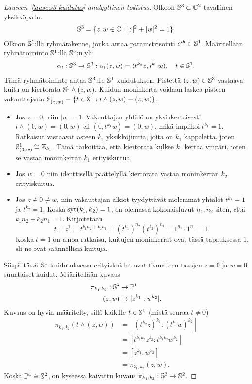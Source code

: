 \begin{proof}[Lauseen~\ref{lause:s3-kuidutus} analyyttinen todistus]
    Olkoon $\S^3\subset\C^2$ tavallinen yksikköpallo:
    \begin{equation*}
        \S^3=\{z,w\in\C:|z|^2+|w|^2=1\}.
    \end{equation*}
    Olkoon $\S^1$:llä ryhmärakenne, jonka antaa parametrisointi $e^{i\theta}\in\S^1$. Määritellään ryhmätoiminto $\S^1$:llä $\S^3$:n yli:
    \begin{equation*}
        \alpha_t:\S^3\to\S^3:\alpha_t(z,w)=(t^{k_2} z,t^{k_1} w),\quad t\in\S^1.
    \end{equation*}
    Tämä ryhmätoiminto antaa $\S^3$:lle $\S^1$-kuidutuksen. Pistettä $(z,w)\in\S^3$ vastaava kuitu on kiertorata $\S^1\wedge(z,w)$. Kuidun moninkerta voidaan laskea pisteen vakauttajasta $\S^1_{(z,w)}=\{t\in\S^1:t\wedge (z,w)=(z,w)\}$.
    \begin{itemize}
        \item Jos $z=0$, niin $|w|=1$. Vakauttajan yhtälö on yksinkertaisesti $t\wedge(0,w)=(0,w)$ eli $(0,t^{k_1} w)=(0,w)$, mikä implikoi $t^{k_1}=1$. Ratkaisut vastaavat asteen $k_1$ yksikköjuuria, joita on $k_1$ kappaletta, joten $\S^1_{(0,w)}\cong\Z_{k_1}$. Tämä tarkoittaa, että kiertorata kulkee $k_1$ kertaa ympäri, joten se vastaa moninkerran $k_1$ erityiskuitua.
        \item Jos $w=0$ niin identtisellä päättelyllä kiertorata vastaa moninkerran $k_2$ erityiskuitua.
        \item Jos $z\ne0\ne w$, niin vakauttajan alkiot tyydyttävät molemmat yhtälöt $t^{k_1}=1$ ja $t^{k_2}=1$. Koska $\syt(k_1,k_2)=1$, on olemassa kokonaisluvut $n_1,n_2$ siten, että $k_1n_2+k_2n_1=1$. Kirjoitetaan
        \begin{equation*}
            t=t^1=t^{k_1n_2+k_2n_1}=(t^{k_1})^{n_2}(t^{k_2})^{n_1}=1^{n_2}\cdot1^{n_1}=1.
        \end{equation*}
        Koska $t=1$ on ainoa ratkaisu, kuitujen moninkerrat ovat tässä tapauksessa 1, eli ne ovat säännöllisiä kuituja.
    \end{itemize}
    Siispä tässä $\S^1$-kuidutuksessa erityiskuidut ovat tismalleen tasojen $z=0$ ja $w=0$ suuntaiset kuidut. Määritellään kuvaus
    \begin{align*}
        \pi_{k_1,k_2}:\S^3&\to\P^1 \\
        (z,w)&\mapsto[z^{k_1}:w^{k_2}].
    \end{align*}
    Kuvaus on hyvin määritelty, sillä kaikille $t\in\S^1$ (mistä seuraa $t\ne0$)
    \begin{align*}
        \pi_{k_1,k_2}(t\wedge(z,w))&=[(t^{k_2} z)^{k_1}:(t^{k_1} w)^{k_2}] \\
        &=[t^{k_1k_2}z^{k_2}:t^{k_1k_2}w^{k_2}] \\
        &=[z^{k_1}:w^{k_2}] \\
        &=\pi_{k_1,k_2}(z,w).
    \end{align*}
    Koska $\P^1\cong\S^2$, on kyseessä kaivattu kuvaus $\pi_{k_1,k_2}:\S^3\to\S^2$.
\end{proof}
